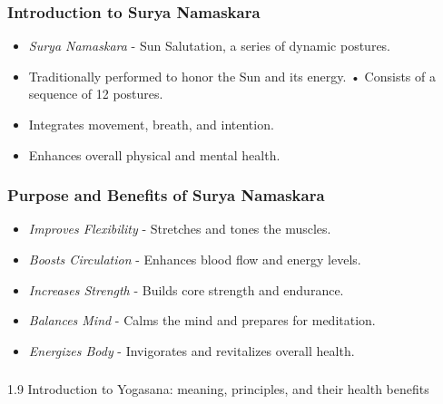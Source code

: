 \begin{frame}[fragile]\frametitle{Introduction to Surya Namaskara}

      \begin{itemize}
		\item \textit{Surya Namaskara} - Sun Salutation, a series of dynamic postures.
		\item Traditionally performed to honor the Sun and its energy.
		• Consists of a sequence of 12 postures.
		\item Integrates movement, breath, and intention.
		\item Enhances overall physical and mental health.
	  \end{itemize}

\end{frame}

\begin{frame}[fragile]\frametitle{Purpose and Benefits of Surya Namaskara}

      \begin{itemize}
		\item \textit{Improves Flexibility} - Stretches and tones the muscles.
		\item \textit{Boosts Circulation} - Enhances blood flow and energy levels.
		\item \textit{Increases Strength} - Builds core strength and endurance.
		\item \textit{Balances Mind} - Calms the mind and prepares for meditation.
		\item \textit{Energizes Body} - Invigorates and revitalizes overall health.
	  \end{itemize}

\end{frame}


\begin{frame}[fragile]\frametitle{}
\begin{center}
{\Large 1.9 Introduction to Yogasana: meaning, principles, and their health benefits}
\end{center}
\end{frame}

